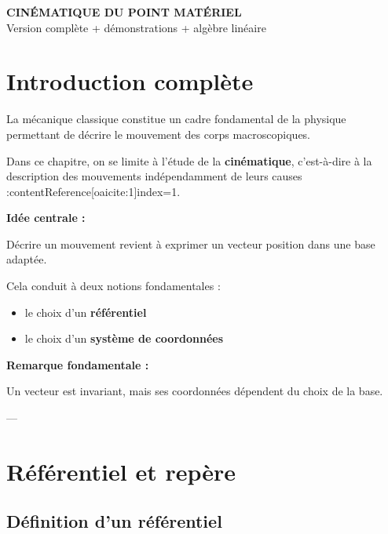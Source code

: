 \documentclass[11pt,a4paper]{article}
\begin{document}
\begin{center}
\Huge \textbf{CINÉMATIQUE DU POINT MATÉRIEL}\\
\Large Version complète + démonstrations + algèbre linéaire
\end{center}

\section{Introduction complète}

La mécanique classique constitue un cadre fondamental de la physique permettant
de décrire le mouvement des corps macroscopiques.

Dans ce chapitre, on se limite à l’étude de la \textbf{cinématique},
c’est-à-dire à la description des mouvements indépendamment de leurs causes :contentReference[oaicite:1]{index=1}.

\bigskip

\textbf{Idée centrale :}
\begin{center}
Décrire un mouvement revient à exprimer un vecteur position dans une base adaptée.
\end{center}

\bigskip

Cela conduit à deux notions fondamentales :

\begin{itemize}
\item le choix d’un \textbf{référentiel}
\item le choix d’un \textbf{système de coordonnées}
\end{itemize}

\bigskip

\textbf{Remarque fondamentale :}

\begin{center}
Un vecteur est invariant, mais ses coordonnées dépendent du choix de la base.
\end{center}

---

\section{Référentiel et repère}

\subsection{Définition d’un référentiel}
\end{document}
